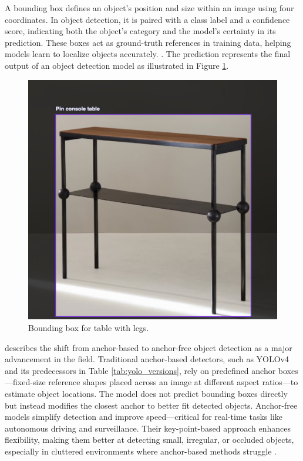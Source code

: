 \documentclass[a4paper,10pt,twocolumn]{article}
\numberwithin{figure}{section}
\numberwithin{table}{section}
\begin{document}
A bounding box defines an object's position and size within an image using four coordinates. 
In object detection, it is paired with a class label and a confidence score, indicating both the object's 
category and the model's certainty in its prediction.
These boxes act as ground-truth references in training data, helping models learn to localize objects accurately.
\citep{li2022yolov6}. The prediction represents the 
final output of an object detection model as illustrated in Figure \ref{fig:bounding}.

\begin{figure}[h]
    \centering
    \includegraphics[width=0.7\linewidth]{bounding.png}  %
    \caption{Bounding box for table with legs.}
    \label{fig:bounding}  
\end{figure}


\cite{vina2024yolo11} describes the shift from anchor-based to anchor-free
object detection as a major advancement in the field. Traditional anchor-based 
detectors, such as YOLOv4 and its predecessors in Table 
\ref{tab:yolo_versions}, rely on predefined anchor 
boxes—fixed-size reference shapes placed across an image at different aspect 
ratios—to estimate object locations. The model does not predict bounding boxes 
directly but instead modifies the closest anchor to better fit detected objects.
Anchor-free models simplify detection and improve speed—critical for 
real-time tasks like autonomous driving and surveillance. Their
 key-point-based approach enhances flexibility, making them better at detecting small,
  irregular, or occluded objects, especially in cluttered environments 
  where anchor-based methods struggle \citep{wang2024yolov9}.
\end{document}

